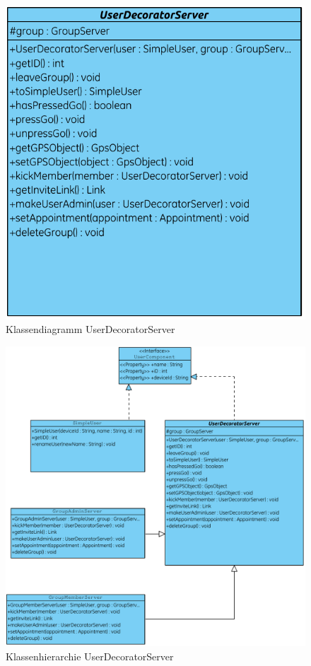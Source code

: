 \begin{figure}[h]
     \centering
     \includegraphics[scale=0.9]{servergraphs/user-decorator-server.pdf}
     \caption{Klassendiagramm UserDecoratorServer}
\end{figure}
\clearpage

\begin{figure}[h]
     \centering
     \hspace*{-2.6cm}\includegraphics[scale=0.9]{servergraphs/user-component.pdf}
     \caption{Klassenhierarchie UserDecoratorServer}
\end{figure}
\clearpage

